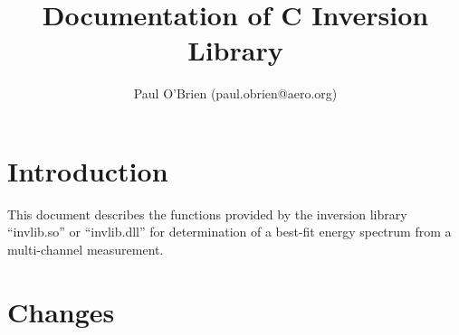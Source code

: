 \documentclass{article}    %
\title{Documentation of C Inversion Library}
\author{Paul O'Brien (paul.obrien@aero.org)}         %
\begin{document}

\maketitle                 %

\tableofcontents

\section{Introduction}

This document describes the functions provided by the inversion
library ``invlib.so'' or ``invlib.dll'' for determination of a
best-fit energy spectrum from a multi-channel measurement.

\section{Changes}
\label{secChanges}
\end{document}
